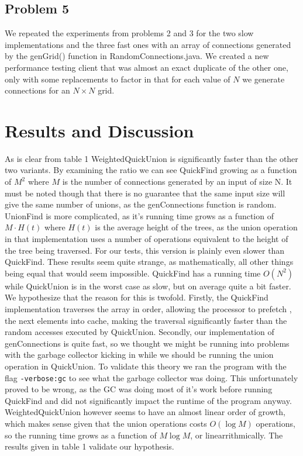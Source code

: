 \documentclass{article}
\begin{document}
\subsection*{Problem 5}
We repeated the experiments from problems 2 and 3 for the two slow implementations and the three fast ones with an array of connections generated by the genGrid() function in RandomConnections.java. We created a new performance testing client that was almost an exact duplicate of the other one, only with some replacements to factor in that for each value of $N$ we generate connections for an $N \times N$ grid.



\section{Results and Discussion}

As is clear from table 1 WeightedQuickUnion is significantly faster than the other two variants. By examining the ratio we can see QuickFind growing as a function of $M^2$ where $M$ is the number of connections generated by an input of size N. It must be noted though that there is no guarantee that the same input size will give the same number of unions, as the genConnections function is random. UnionFind is more complicated, as it's running time grows as a function of $M \cdot H(t)$ where $H(t)$ is the average height of the trees, as the union operation in that implementation uses a number of operations equivalent to the height of the tree being traversed. For our tests, this version is plainly even slower than QuickFind. These results seem quite strange, as mathematically, all other things being equal that would seem impossible. QuickFind has a running time $O(N^2)$ while QuickUnion is in the worst case as slow, but on average quite a bit faster. We hypothesize that the reason for this is twofold. Firstly, the QuickFind implementation traverses the array in order, allowing the processor to prefetch \cite{Intel}, \cite{Intel:AORM} the next elements into cache, making the traversal significantly faster than the random accesses executed by QuickUnion. Secondly, our implementation of genConnections is quite fast, so we thought we might be running into problems with the garbage collector kicking in while we should be running the union operation in QuickUnion. To validate this theory we ran the program with the flag \texttt{-verbose:gc} to see what the garbage collector was doing. This unfortunately proved to be wrong, as the GC was doing most of it's work before running QuickFind and did not significantly impact the runtime of the program anyway. WeightedQuickUnion however seems to have an almost linear order of growth, which makes sense given that the union operations costs $O( \log M)$ operations, so the running time grows as a function of $M \log M$, or linearrithmically. The results given in table 1 validate our hypothesis.\\
\end{document}
